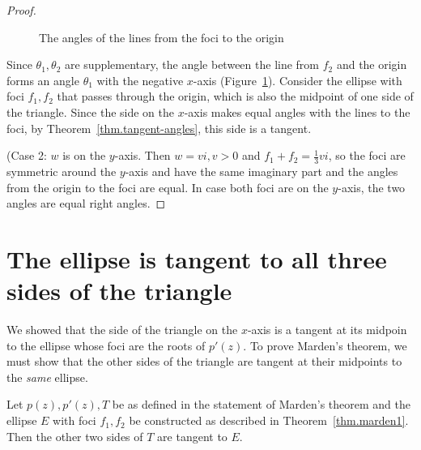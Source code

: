 \begin{proof}
\begin{figure}[t]
\begin{center}
\begin{tikzpicture}[scale=2.5]
\end{tikzpicture}
\caption{The angles of the lines from the foci to the origin}\label{f.marden-ellipses}
\end{center}
\end{figure}

Since $\theta_1, \theta_2$ are supplementary, the angle between the line from $f_2$ and the origin forms an angle $\theta_1$ with the negative $x$-axis (Figure~\ref{f.marden-ellipses}). Consider the ellipse with foci $f_1,f_2$ that passes through the origin, which is also the midpoint of one side of the triangle. Since the side on the $x$-axis makes equal angles with the lines to the foci, by Theorem~\ref{thm.tangent-angles}, this side is a tangent.

(Case 2: $w$ is on the $y$-axis. Then $w=vi, v>0$ and $f_1+f_2=\frac{1}{3}vi$, so the foci are symmetric around the $y$-axis and have the same imaginary part and the angles from the origin to the foci are equal. In case both foci are on the $y$-axis, the two angles are equal right angles.\hqed
\end{proof}


\section{The ellipse is tangent to all three sides of the triangle}

We showed that the side of the triangle on the $x$-axis is a tangent at its midpoin to the ellipse whose foci are the roots of $p'(z)$. To prove Marden's theorem, we must show that the other sides of the triangle are tangent at their midpoints to the \emph{same} ellipse. 

\begin{theorem}\label{thm.marden2}
Let $p(z),p'(z),T$ be as defined in the statement of Marden's theorem and the ellipse $E$ with foci $f_1,f_2$ be constructed as described in Theorem~\ref{thm.marden1}. Then the other two sides of $T$ are tangent to $E$.
\end{theorem}


